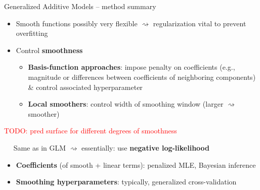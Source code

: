 \begin{frame}{Generalized Additive Models -- method summary}

\begin{itemize}
    \item Smooth functions possibly very flexible $\rightsquigarrow$
    regularization vital to prevent overfitting
    \item Control \textbf{smoothness}
    \begin{itemize}
      \item \textbf{Basis-function approaches}: impose penalty on coefficients
      (e.g., magnitude or differences between coefficients of neighboring
      components) \& control associated hyperparameter
      \item \textbf{Local smoothers}: control width of smoothing window
      (larger $\rightsquigarrow$ smoother)
    \end{itemize}
\end{itemize}

\medskip
\textcolor{red}{TODO: pred surface for different degrees of smoothness}

\medskip

 ~~ Same as in GLM $\rightsquigarrow$ essentially:
use \textbf{negative log-likelihood}

\medskip

\begin{itemize}
  \item \textbf{Coefficients} (of smooth + linear terms):
  penalized MLE, Bayesian inference
  \item \textbf{Smoothing hyperparameters}: typically, generalized
  cross-validation
\end{itemize}

\end{frame}


